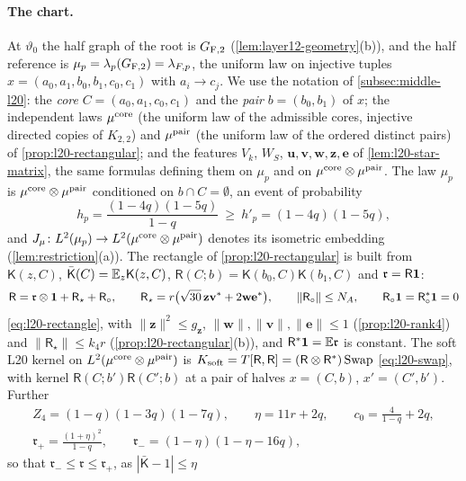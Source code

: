 \paragraph{The chart.}
At $\vartheta_0$ the half graph of the root is $G_{\rm F,2}$
(\cref{lem:layer12-geometry}(b)), and the half reference is
$\mu_p=\lambda_p(G_{\rm F,2})=\lambda_{F,p}$, the uniform law on injective tuples
$x=(a_0,a_1,b_0,b_1,c_0,c_1)$ with $a_i\to c_j$. We use the notation of
\cref{subsec:middle-l20}: the \emph{core} $C=(a_0,a_1,c_0,c_1)$ and the \emph{pair}
$b=(b_0,b_1)$ of $x$; the independent laws $\mu^{\rm core}$ (the uniform law of the
admissible cores, injective directed copies of $K_{2,2}$) and $\mu^{\rm pair}$ (the uniform
law of the ordered distinct pairs) of \cref{prop:l20-rectangular}; and the features
$V_k$, $W_S$, $\mathbf u,\mathbf v,\mathbf w,\mathbf z,\mathbf e$ of
\cref{lem:l20-star-matrix}, the same formulas defining them on $\mu_p$ and on
$\mu^{\rm core}\otimes\mu^{\rm pair}$. The law $\mu_p$ is $\mu^{\rm core}\otimes\mu^{\rm pair}$
conditioned on $b\cap C=\emptyset$, an event of probability
\[
 h_p=\frac{(1-4q)(1-5q)}{1-q}\ \ge\ h'_p=(1-4q)(1-5q),
\]
and $J_\mu\colon L^2(\mu_p)\to L^2(\mu^{\rm core}\otimes\mu^{\rm pair})$ denotes its
isometric embedding (\cref{lem:restriction}(a)). The rectangle of
\cref{prop:l20-rectangular} is built from $\mathsf K(z,C)$,
$\bar{\mathsf K}(C)=\mathbb E_z\mathsf K(z,C)$, $\mathsf R(C;b)=\mathsf K(b_0,C)\mathsf K(b_1,C)$ and
$\mathfrak r=\mathsf R\mathbf 1$:
\[
 \mathsf R=\mathfrak r\otimes\mathbf 1+\mathsf R_\star+\mathsf R_\circ,\qquad
 \mathsf R_\star=r\bigl(\sqrt{30}\,\mathbf z\mathbf v^*+2\mathbf w\mathbf e^*\bigr),\qquad
 \|\mathsf R_\circ\|\le N_A,\qquad\mathsf R_\circ\mathbf 1=\mathsf R_\circ^*\mathbf 1=0
\]
\eqref{eq:l20-rectangle}, with $\|\mathbf z\|^2\le g_{\mathbf z}$,
$\|\mathbf w\|,\|\mathbf v\|,\|\mathbf e\|\le1$ (\cref{prop:l20-rank4}) and
$\|\mathsf R_\star\|\le k_4r$ (\cref{prop:l20-rectangular}(b)), and $\mathsf R^*\mathbf 1=\mathbb E\mathfrak r$
is constant. The soft L20 kernel
on $L^2(\mu^{\rm core}\otimes\mu^{\rm pair})$ is
$K_{\rm soft}=T[\mathsf R,\mathsf R]=(\mathsf R\otimes\mathsf R^*)\operatorname{Swap}$
\eqref{eq:l20-swap}, with kernel $\mathsf R(C;b')\mathsf R(C';b)$ at a pair of halves
$x=(C,b)$, $x'=(C',b')$. Further
\begin{gather*}
 Z_4=(1-q)(1-3q)(1-7q),\qquad\eta=11r+2q,\qquad c_0=\frac4{1-q}+2q,\\
 \mathfrak r_+=\frac{(1+\eta)^2}{1-q},\qquad\mathfrak r_-=(1-\eta)(1-\eta-16q),
\end{gather*}
so that $\mathfrak r_-\le\mathfrak r\le\mathfrak r_+$, as $|\bar{\mathsf K}-1|\le\eta$
